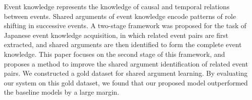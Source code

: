 Event knowledge represents the knowledge of causal and temporal relations between events. Shared arguments of event knowledge encode patterns of role shifting in successive events. A two-stage framework was proposed for the task of Japanese event knowledge acquisition, in which related event pairs are first extracted, and shared arguments are then identified to form the complete event knowledge. This paper focuses on the second stage of this framework, and proposes a method to improve the shared argument identification of related event pairs. We constructed a gold dataset for shared argument learning. By evaluating our system on this gold dataset, we found that our proposed model outperformed the baseline models by a large margin.

